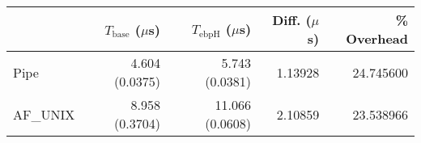 \begin{tabular}{>{\ttfamily}lrrrr}
\toprule
\multicolumn{1}{l}{Type} & $T_\text{base}$ ($\mu$s) & $T_\text{ebpH}$ ($\mu$s) &  Diff. ($\mu$s) &  \% Overhead \\
\midrule
                    Pipe &           4.604 (0.0375) &           5.743 (0.0381) &         1.13928 &    24.745600 \\
                AF\_UNIX &           8.958 (0.3704) &          11.066 (0.0608) &         2.10859 &    23.538966 \\
\bottomrule
\end{tabular}
